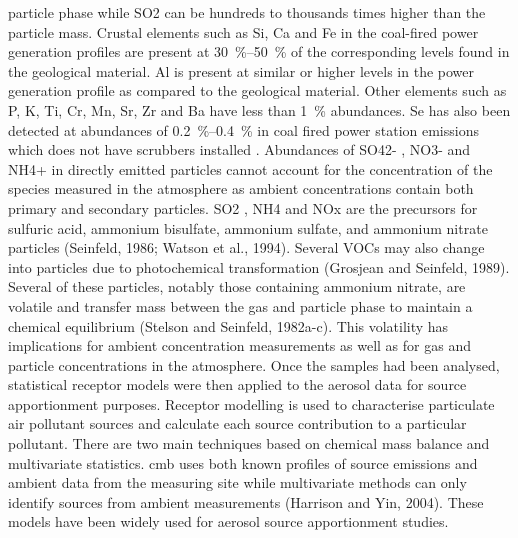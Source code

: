 \documentclass{nwureport}
\begin{document}
particle phase while SO2 can be hundreds to thousands times higher than the particle mass. Crustal
elements such as Si, Ca and Fe in the coal-fired power generation profiles are present at \SIrange{30}{50}{\percent} of the
corresponding levels found in the geological material. Al is present at similar or higher levels in the power
generation profile as compared to the geological material. Other elements such as P, K, Ti, Cr, Mn, Sr, Zr and
Ba have less than \SI{1}{\percent} abundances. Se has also been detected at abundances of \SIrange{0.2}{0.4}{\percent} in coal fired
power station emissions which does not have scrubbers installed \citep{Watson1996}. Abundances of
SO42- , NO3- and NH4+ in directly emitted particles cannot account for the concentration of the species
measured in the atmosphere as ambient concentrations contain both primary and secondary particles. SO2 ,
NH4 and NOx are the precursors for sulfuric acid, ammonium bisulfate, ammonium sulfate, and ammonium
nitrate particles (Seinfeld, 1986; Watson et al., 1994). Several VOCs may also change into particles due to
photochemical transformation (Grosjean and Seinfeld, 1989). Several of these particles, notably those
containing ammonium nitrate, are volatile and transfer mass between the gas and particle phase to maintain
a chemical equilibrium (Stelson and Seinfeld, 1982a-c). This volatility has implications for ambient
concentration measurements as well as for gas and particle concentrations in the atmosphere.
Once the samples had been analysed, statistical receptor models were then applied to the aerosol data for
source apportionment purposes. Receptor modelling is used to characterise particulate air pollutant sources
and calculate each source contribution to a particular pollutant. There are two main techniques based on
chemical mass balance and multivariate statistics. \gls{cmb} uses both known profiles
of source emissions and ambient data from the measuring site while multivariate methods can only identify
sources from ambient measurements (Harrison and Yin, 2004). These models have been widely used for
aerosol source apportionment studies.
\end{document}
